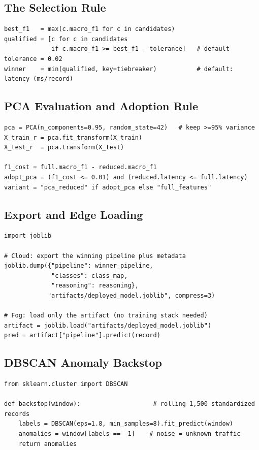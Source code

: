 \documentclass[12pt,a4paper]{article}
\begin{document}
\subsection{The Selection Rule}
\begin{lstlisting}
best_f1   = max(c.macro_f1 for c in candidates)
qualified = [c for c in candidates
             if c.macro_f1 >= best_f1 - tolerance]   # default tolerance = 0.02
winner    = min(qualified, key=tiebreaker)           # default: latency (ms/record)
\end{lstlisting}

\subsection{PCA Evaluation and Adoption Rule}
\begin{lstlisting}
pca = PCA(n_components=0.95, random_state=42)   # keep >=95% variance
X_train_r = pca.fit_transform(X_train)
X_test_r  = pca.transform(X_test)

f1_cost = full.macro_f1 - reduced.macro_f1
adopt_pca = (f1_cost <= 0.01) and (reduced.latency <= full.latency)
variant = "pca_reduced" if adopt_pca else "full_features"
\end{lstlisting}

\subsection{Export and Edge Loading}
\begin{lstlisting}
import joblib

# Cloud: export the winning pipeline plus metadata
joblib.dump({"pipeline": winner_pipeline,
             "classes": class_map,
             "reasoning": reasoning},
            "artifacts/deployed_model.joblib", compress=3)

# Fog: load only the artifact (no training stack needed)
artifact = joblib.load("artifacts/deployed_model.joblib")
pred = artifact["pipeline"].predict(record)
\end{lstlisting}

\subsection{DBSCAN Anomaly Backstop}
\begin{lstlisting}
from sklearn.cluster import DBSCAN

def backstop(window):                    # rolling 1,500 standardized records
    labels = DBSCAN(eps=1.8, min_samples=8).fit_predict(window)
    anomalies = window[labels == -1]    # noise = unknown traffic
    return anomalies
\end{lstlisting}
\end{document}
